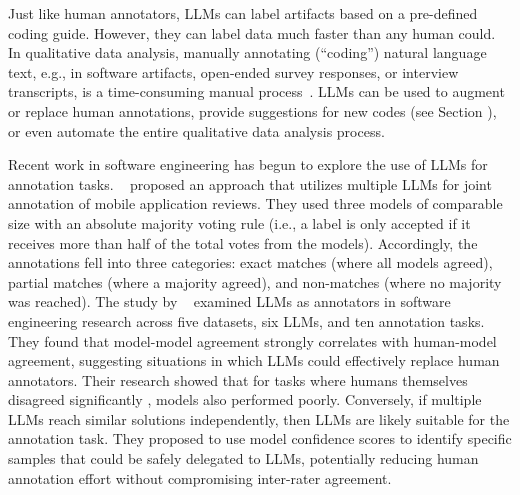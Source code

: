 \label{sec:llms-as-annotators}

Just like human annotators, LLMs can label artifacts based on a pre-defined coding guide.
However, they can label data much faster than any human could. 
In qualitative data analysis, manually annotating (``coding'') natural language text, e.g., in software artifacts, open-ended survey responses, or interview transcripts, is a time-consuming manual process~\cite{DBLP:journals/ase/BanoHZT24}.
LLMs can be used to augment or replace human annotations, provide suggestions for new codes (see Section \synthesis), or even automate the entire qualitative data analysis process.

Recent work in software engineering has begun to explore the use of LLMs for annotation tasks.
\citeauthor{Huang2023Enhancing}~\cite{Huang2023Enhancing} proposed an approach that utilizes multiple LLMs for joint annotation of mobile application reviews. 
They used three models of comparable size with an absolute majority voting rule (i.e., a label is only accepted if it receives more than half of the total votes from the models).
Accordingly, the annotations fell into three categories: exact matches (where all models agreed), partial matches (where a majority agreed), and non-matches (where no majority was reached).
The study by \citeauthor{DBLP:conf/msr/AhmedDTP25}~\cite{DBLP:conf/msr/AhmedDTP25} examined LLMs as annotators in software engineering research across five datasets, six LLMs, and ten annotation tasks.
They found that model-model agreement strongly correlates with human-model agreement, suggesting situations in which LLMs could effectively replace human annotators. Their research showed that for tasks where humans themselves disagreed significantly , models also performed poorly.
Conversely, if multiple LLMs reach similar solutions independently, then LLMs are likely suitable for the annotation task.
They proposed to use model confidence scores to identify specific samples that could be safely delegated to LLMs, potentially reducing human annotation effort without compromising inter-rater agreement.


